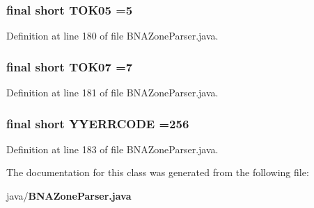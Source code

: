 \subsubsection[{T\+O\+K05}]{\setlength{\rightskip}{0pt plus 5cm}final short T\+O\+K05 =5\hspace{0.3cm}{\ttfamily [static]}}\label{classorg_1_1smallfoot_1_1parser_1_1zone_1_1BNAZoneParser_a6cdf016becc8cc687612ded338623bfc}


Definition at line 180 of file B\+N\+A\+Zone\+Parser.\+java.

\subsubsection[{T\+O\+K07}]{\setlength{\rightskip}{0pt plus 5cm}final short T\+O\+K07 =7\hspace{0.3cm}{\ttfamily [static]}}\label{classorg_1_1smallfoot_1_1parser_1_1zone_1_1BNAZoneParser_aaef5d04e154fb070f09d2255a2ab594f}


Definition at line 181 of file B\+N\+A\+Zone\+Parser.\+java.

\subsubsection[{Y\+Y\+E\+R\+R\+C\+O\+D\+E}]{\setlength{\rightskip}{0pt plus 5cm}final short Y\+Y\+E\+R\+R\+C\+O\+D\+E =256\hspace{0.3cm}{\ttfamily [static]}}\label{classorg_1_1smallfoot_1_1parser_1_1zone_1_1BNAZoneParser_a1c58472ea6621d2f613831e08d10dba3}


Definition at line 183 of file B\+N\+A\+Zone\+Parser.\+java.



The documentation for this class was generated from the following file\+:\begin{DoxyCompactItemize}
\item 
java/{\bf B\+N\+A\+Zone\+Parser.\+java}\end{DoxyCompactItemize}
